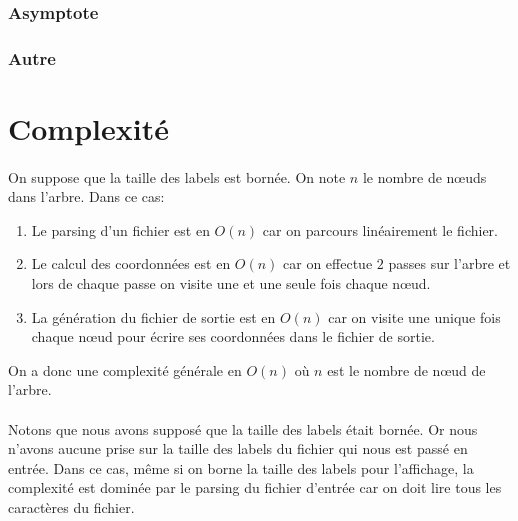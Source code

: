 		\subsubsection*{Asymptote}

		
		\subsubsection*{Autre}


\section{Complexité}

\paragraph{}On suppose que la taille des labels est bornée. On note $n$ le nombre de n\oe uds dans l'arbre. Dans ce cas:

\begin{enumerate}
	\item Le parsing d'un fichier est en $O(n)$ car on parcours linéairement le fichier.
	\item Le calcul des coordonnées est en $O(n)$ car on effectue $2$ passes sur l'arbre et lors de chaque passe on visite une et une seule fois chaque n\oe ud.
	\item La génération du fichier de sortie est en $O(n)$ car on visite une unique fois chaque n\oe ud pour écrire ses coordonnées dans le fichier de sortie.
\end{enumerate}
On a donc une complexité générale en $O(n)$ où $n$ est le nombre de n\oe ud de l'arbre.

\paragraph{}Notons que nous avons supposé que la taille des labels était bornée. Or nous n'avons aucune prise sur la taille des labels du fichier qui nous est passé en entrée. Dans ce cas, même si on borne la taille des labels pour l'affichage, la complexité est dominée par le parsing du fichier d'entrée car on doit lire tous les caractères du fichier.